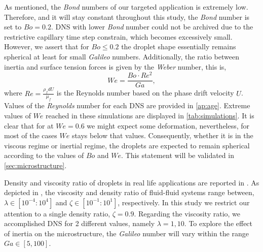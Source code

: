 As mentioned, the \textit{Bond} numbers of our targeted application is extremely low.
Therefore, and it will stay constant throughout this study, the \textit{Bond} number is set to $Bo = 0.2$.
DNS with lower \textit{Bond} number could not be archived due to the restrictive capillary time step constrain, which becomes excessively small. 
However, we assert that for $Bo \leq 0.2$ the droplet shape essentially remains spherical at least for small \textit{Galileo} numbers. 
Additionally, the ratio between inertia and surface tension forces is given by the \textit{Weber} number, this is,
\begin{equation*}
    We = \frac{Bo \cdot Re^2}{Ga},
\end{equation*}
where $Re = \frac{\rho_f d U}{\mu_f}$ is the Reynolds number based on the phase drift velocity $U$.
Values of the \textit{Reynolds} number for each DNS are provided in \ref{ap:age}. 
Extreme values of $We$ reached in these simulations are displayed in \ref{tab:simulations}. 
It is clear that for at $We=0.6$ we might expect some deformation, nevertheless, for most of the cases $We$ stays below that values. 
Consequently, whether it is in the viscous regime or inertial regime, the droplets are expected to remain spherical according to the values of $Bo$ and $We$.
This statement will be validated in \ref{sec:microstructure}. 

Density and viscosity ratio of droplets in real life applications are reported in \citet[Figure 1.]{balla2020effect}.
As depicted in \citet[Figure 1.]{balla2020effect}, the viscosity and density ratio of fluid-fluid systems range between, $\lambda \in [10^{-4} : 10^4]$ and $\zeta \in [10^{-1} : 10^1]$, respectively. 
In this study we restrict our attention to a single density ratio, $\zeta = 0.9$.
Regarding the viscosity ratio, we accomplished DNS for 2 different values, namely $\lambda = 1,10$.
To explore the effect of inertia on the microstructure, the \textit{Galileo} number will vary within the range $Ga \in [5,100]$.

